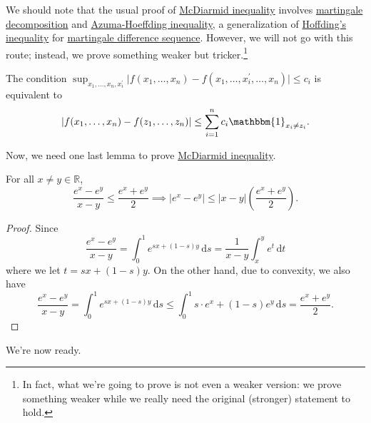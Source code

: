 We should note that the usual proof of \hyperref[thm:McDiarmid-inequality]{McDiarmid inequality} involves \hyperref[def:martingale-decomposition]{martingale decomposition} and \hyperref[thm:Azuma-Hoeffding-inequality]{Azuma-Hoeffding inequality}, a generalization of \hyperref[thm:Hoeffding-inequality]{Hoffding's inequality} for \hyperref[def:martingale-difference-sequence]{martingale difference sequence}. However, we will not go with this route; instead, we prove something weaker but tricker.\footnote{In fact, what we're going to prove is not even a weaker version: we prove something weaker while we really need the original (stronger) statement to hold.}

\begin{note}
	The condition \(\sup _{x_1, \dots , x_n, x_i^{\prime} }\vert f(x_1, \dots , x_n) - f(x_1, \dots , x_i^{\prime} , \dots , x_n) \vert \leq c_i\) is equivalent to
	\[
		\vert f(x_1, \dots , x_n) - f(z_1, \dots , z_n) \vert \leq \sum_{i=1}^{n} c_i \mathbbm{1}_{x_i \neq z_i}.
	\]
\end{note}

Now, we need one last lemma to prove \hyperref[thm:McDiarmid-inequality]{McDiarmid inequality}.

\begin{lemma}\label{lma:lec5}
	For all \(x \neq y \in \mathbb{R} \),
	\[
		\frac{e^x - e^y}{x-y} \leq \frac{e^x + e^y}{2} \implies \vert e^x - e^y \vert \leq \vert x - y \vert \left( \frac{e^x + e^y}{2} \right).
	\]
\end{lemma}
\begin{proof}
	Since
	\[
		\frac{e^x - e^y}{x-y}
		= \int_{0}^{1} e^{s x + (1 - s)y} \,\mathrm{d}s
		= \frac{1}{x - y} \int_{x}^{y} e^t \,\mathrm{d}t
	\]
	where we let \(t = sx + (1 - s)y\). On the other hand, due to convexity, we also have
	\[
		\frac{e^x - e^y}{x-y}
		= \int_{0}^{1} e^{s x + (1 - s)y} \,\mathrm{d}s
		\leq \int_{0}^{1} s\cdot e^x + (1 - s)e^y \,\mathrm{d}s
		= \frac{e^x + e^y}{2}.
	\]
\end{proof}

We're now ready.

